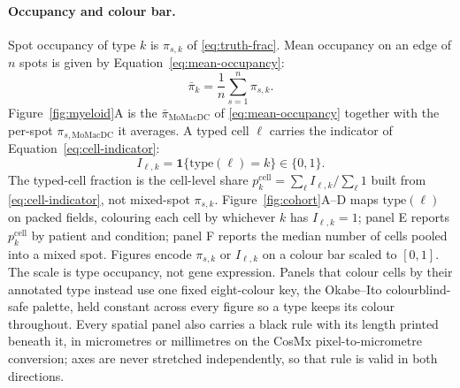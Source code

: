 \paragraph{Occupancy and colour bar.}
Spot occupancy of type \(k\) is \(\pi_{s,k}\) of \eqref{eq:truth-frac}. Mean occupancy on an edge of \(n\) spots is given by Equation~\eqref{eq:mean-occupancy}:
\begin{equation}
\bar\pi_{k}=\frac{1}{n}\sum_{s=1}^{n}\pi_{s,k}.
\label{eq:mean-occupancy}
\end{equation}
Figure~\ref{fig:myeloid}A is the \(\bar\pi_{\mathrm{MoMacDC}}\) of \eqref{eq:mean-occupancy} together with the per-spot \(\pi_{s,\mathrm{MoMacDC}}\) it averages. A typed cell \(\ell\) carries the indicator of Equation~\eqref{eq:cell-indicator}:
\begin{equation}
I_{\ell,k}=\mathbf{1}\{\mathrm{type}(\ell)=k\}\in\{0,1\}.
\label{eq:cell-indicator}
\end{equation}
The typed-cell fraction is the cell-level share \(p_{k}^{\mathrm{cell}}=\sum_{\ell}I_{\ell,k}/\sum_{\ell}1\) built from \eqref{eq:cell-indicator}, not mixed-spot \(\pi_{s,k}\). Figure~\ref{fig:cohort}A--D maps \(\mathrm{type}(\ell)\) on packed fields, colouring each cell by whichever \(k\) has \(I_{\ell,k}=1\); panel E reports \(p_{k}^{\mathrm{cell}}\) by patient and condition; panel F reports the median number of cells pooled into a mixed spot. Figures encode \(\pi_{s,k}\) or \(I_{\ell,k}\) on a colour bar scaled to \([0,1]\). The scale is type occupancy, not gene expression. Panels that colour cells by their annotated type instead use one fixed eight-colour key, the Okabe--Ito colourblind-safe palette, held constant across every figure so a type keeps its colour throughout. Every spatial panel also carries a black rule with its length printed beneath it, in micrometres or millimetres on the CosMx pixel-to-micrometre conversion; axes are never stretched independently, so that rule is valid in both directions.

